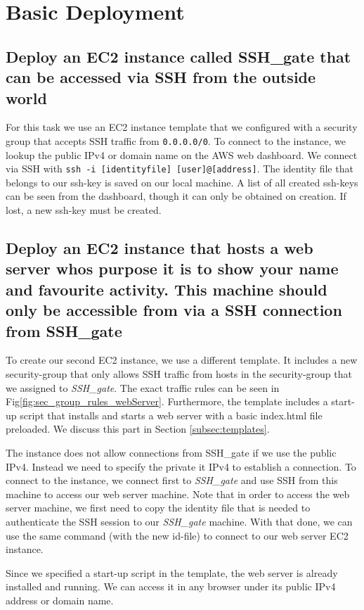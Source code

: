 \chapter{Basic Deployment}

\section{Deploy an EC2 instance called SSH\_gate that can be accessed via SSH from the outside world}

For this task we use an EC2 instance template that we configured with a security group that accepts SSH traffic from \texttt{0.0.0.0/0}.
To connect to the instance, we lookup the public IPv4 or domain name on the AWS web dashboard. We connect via SSH with \texttt{ssh -i [identityfile] [user]@[address]}. The identity file that belongs to our ssh-key is saved on our local machine. A list of all created ssh-keys can be seen from the dashboard, though it can only be obtained on creation. If lost, a new ssh-key must be created.


\section{Deploy an EC2 instance that hosts a web server whos purpose it is to show your name and favourite activity. This machine should only be accessible from via a SSH connection from SSH\_gate}
To create our second EC2 instance, we use a different template. It includes a new security-group that only allows SSH traffic from hosts in the security-group that we assigned to \textsl{SSH\_gate}. The exact traffic rules can be seen in Fig\ref{fig:sec_group_rules_webServer}. Furthermore, the template includes a start-up script that installs and starts a web server with a basic index.html file preloaded. We discuss this part in Section \ref{subsec:templates}.

The instance does not allow connections from SSH\_gate if we use the public IPv4. Instead we need to specify the private it IPv4 to establish a connection.
To connect to the instance, we connect first to \textsl{SSH\_gate} and use SSH from this machine to access our web server machine. Note that in order to access the web server machine, we first need to copy the identity file that is needed to authenticate the SSH session to our \textsl{SSH\_gate} machine. With that done, we can use the same command (with the new id-file) to connect to our web server EC2 instance.

Since we specified a start-up script in the template, the web server is already installed and running. We can access it in any browser under its public IPv4 address or domain name.

